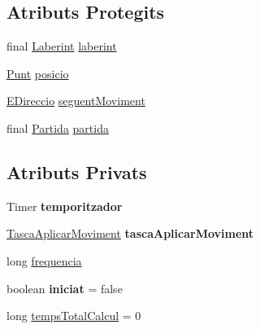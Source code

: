 \subsection*{Atributs Protegits}
\begin{DoxyCompactItemize}
\item 
final \hyperlink{classlogica_1_1laberints_1_1_laberint}{Laberint} \hyperlink{classlogica_1_1_item_movible_a97036130b7376d77776427ca126f6fb5}{laberint}
\item 
\hyperlink{classlogica_1_1_punt}{Punt} \hyperlink{classlogica_1_1_item_movible_a9380636109f2180b48ee96e64de319a4}{posicio}
\item 
\hyperlink{enumlogica_1_1enumeracions_1_1_e_direccio}{E\+Direccio} \hyperlink{classlogica_1_1_item_movible_a6e7ab9e5b0e363972a753e6b1550e7fb}{seguent\+Moviment}
\item 
final \hyperlink{classlogica_1_1_partida}{Partida} \hyperlink{classlogica_1_1_item_movible_ace55b4918a7f671f89ed3109c91359e4}{partida}
\end{DoxyCompactItemize}
\subsection*{Atributs Privats}
\begin{DoxyCompactItemize}
\item 
\hypertarget{classlogica_1_1_item_movible_a1818356021a0bc1927e44587484528ce}{Timer {\bfseries temporitzador}}\label{classlogica_1_1_item_movible_a1818356021a0bc1927e44587484528ce}

\item 
\hypertarget{classlogica_1_1_item_movible_a1d3192eb8b3451aebce9eb76fb38866d}{\hyperlink{classlogica_1_1_item_movible_1_1_tasca_aplicar_moviment}{Tasca\+Aplicar\+Moviment} {\bfseries tasca\+Aplicar\+Moviment}}\label{classlogica_1_1_item_movible_a1d3192eb8b3451aebce9eb76fb38866d}

\item 
long \hyperlink{classlogica_1_1_item_movible_a1b3a9d9e664cfe044d60cbe083dc7919}{frequencia}
\item 
\hypertarget{classlogica_1_1_item_movible_aea59ac3ebc4c975710d17162d3f27455}{boolean {\bfseries iniciat} = false}\label{classlogica_1_1_item_movible_aea59ac3ebc4c975710d17162d3f27455}

\item 
long \hyperlink{classlogica_1_1_item_movible_acc514a1b03e6f87bd157f334837ea7c0}{temps\+Total\+Calcul} = 0
\end{DoxyCompactItemize}


